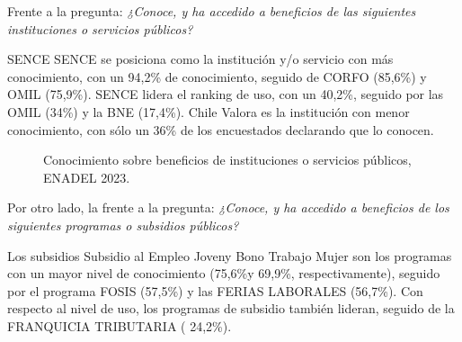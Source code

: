 \documentclass[
  11pt,
]{article}
\begin{document}
Frente a la pregunta: \emph{¿Conoce, y ha accedido a beneficios de las
siguientes instituciones o servicios públicos?}

SENCE SENCE se posiciona como la institución y/o servicio con más
conocimiento, con un 94,2\% de conocimiento, seguido de CORFO (85,6\%) y
OMIL (75,9\%). SENCE lidera el ranking de uso, con un 40,2\%, seguido
por las OMIL (34\%) y la BNE (17,4\%). Chile Valora es la institución
con menor conocimiento, con sólo un 36\% de los encuestados declarando
que lo conocen.

\begin{figure}[H]

\caption{\label{fig-conocimiento_1}Conocimiento sobre beneficios de
instituciones o servicios públicos, ENADEL 2023.}


\end{figure}%

Por otro lado, la frente a la pregunta: \emph{¿Conoce, y ha accedido a
beneficios de los siguientes programas o subsidios públicos?}

Los subsidios Subsidio al Empleo Joveny Bono Trabajo Mujer son los
programas con un mayor nivel de conocimiento (75,6\%y 69,9\%,
respectivamente), seguido por el programa FOSIS (57,5\%) y las FERIAS
LABORALES (56,7\%). Con respecto al nivel de uso, los programas de
subsidio también lideran, seguido de la FRANQUICIA TRIBUTARIA ( 24,2\%).
\end{document}
